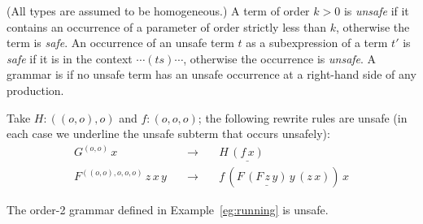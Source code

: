 \begin{definition}\rm
\label{def:safegrammar}
  (All types are assumed to be homogeneous.) A term of order $k > 0$
  is \emph{unsafe} if it contains an occurrence of a parameter of
  order strictly less than $k$, otherwise the term is \emph{safe}. An
  occurrence of an unsafe term $t$ as a subexpression of a term $t'$
  is \emph{safe} if it is in the context $\cdots (ts) \cdots$,
  otherwise the occurrence is \emph{unsafe}. A grammar is
   if no unsafe term has an unsafe occurrence at a
  right-hand side of any production.
\end{definition}

\begin{example}\begin{inparaenum}[(i)] \item Take $H : ((o, o), o)$ and $f : (o, o, o)$; the
    following rewrite rules are unsafe (in each case we underline the
    unsafe subterm that occurs unsafely):
\[\begin{array}{rll}
G^{(o, o)} \, x & \quad \rightarrow \quad & H \, \underline{(f \, {x})} \\
F^{((o, o), o, o, o)} \, z \, x \, y & \quad \rightarrow \quad & f \, (F \, \underline{(F \, z
\, {y})} \, y \, (z \, x) ) \, x
\end{array}\]
\item The order-2 grammar defined in Example~\ref{eg:running} is
  unsafe.
\end{inparaenum}
\end{example}

